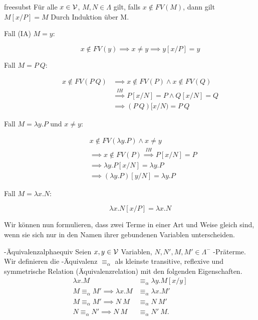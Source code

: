 \begin{lemma}{}{freesubst}
    Für alle $x\in\mathcal{V}$, $M,N\in\Lambda$ gilt, falls $x\notin FV(M)$, dann gilt $M[x/P] = M$
    \Proof
    Durch Induktion über M.
    \begin{description}
        \item[Fall (IA) $M = y$:] 
        \[x\notin FV(y)\implies x \neq y \implies y[x/P] = y\]
        \item[Fall $M = P~Q$:]  
        \begin{align*}
        x\notin FV(P~Q)&\implies x \notin FV(P) \land x \notin FV(Q)\\
        &\overset{IH}{\implies} P[x/N] = P \land Q[x/N] = Q \\
        &\implies (P~Q)[x/N)=P~Q
        \end{align*}      
        \item[Fall $M = \lambda y.P$ und $x \neq y$:] 
        \begin{align*}
        &x\notin FV(\lambda y.P)\land x\neq y \\
        & \implies x\notin FV(P) \overset{IH}{\implies}P[x/N]=P\\
        &\implies \lambda y.P[x/N] = \lambda y.P \\
        &\implies (\lambda y.P)[y/N] = \lambda y.P
               \end{align*}        
        \item[Fall $M = \lambda x.N$:] 
        \[\lambda x.N[x/P]=\lambda x.N\]
    \end{description}
\end{lemma}

Wir können nun formulieren, dass zwei Terme in einer Art und Weise gleich sind, wenn sie sich nur in den Namen ihrer gebundenen Variablen unterscheiden.

\begin{definition}{\talpha-Äquivalenz}{alphaequiv}
    Seien $x,y\in\mathcal{V}$ Variablen, $N, N', M, M'\in\Lambda^-$ \tlambda-Präterme. Wir definieren die \talpha-Äquivalenz $\equiv_\alpha$ als kleinste transitive, reflexive und symmetrische Relation (Äquivalenzrelation) mit den folgenden Eigenschaften.
    \begin{align*}        
     \lambda x.M &\equiv_\alpha \lambda y.M[x/y]\\  
    M\equiv_\alpha M' \implies \lambda x.M &\equiv_\alpha \lambda x.M'\\
    M\equiv_\alpha M' \implies N~M&\equiv_\alpha N~M'\\
    N\equiv_\alpha N' \implies N~M&\equiv_\alpha N'~M.
    \end{align*}
\end{definition}

